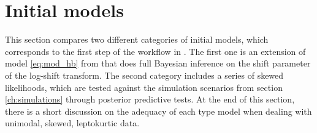 \section{Initial models}
\label{ch:initial}
This section compares two different categories of initial models, which corresponds to the first step of the workflow in \cite{gelman_bayesian_2020}.
The first one is an extension of model \ref{eq:mod_hb} from \cite{morelli_hierarchical_2021} that does full Bayesian inference on the shift parameter of the log-shift transform.
The second category includes a series of skewed likelihoods, which are tested against the simulation scenarios from section \ref{ch:simulations} through posterior predictive tests.
At the end of this section, there is a short discussion on the adequacy of each type model when dealing with unimodal, skewed, leptokurtic data.



